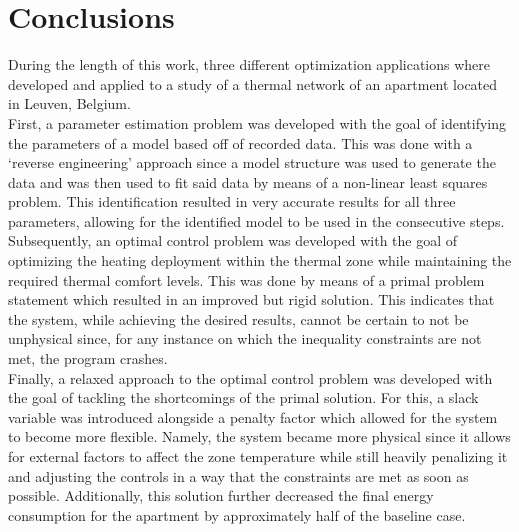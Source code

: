 \section{Conclusions}
\label{sec:conclusions}

During the length of this work, three different optimization applications where developed and applied to a study of a thermal network of an apartment located in Leuven, Belgium. \\

First, a parameter estimation problem was developed with the goal of identifying the parameters of a model based off of recorded data. This was done with a `reverse engineering' approach since a model structure was used to generate the data and was then used to fit said data by means of a non-linear least squares problem. This identification resulted in very accurate results for all three parameters, allowing for the identified model to be used in the consecutive steps.\\

Subsequently, an optimal control problem was developed with the goal of optimizing the heating deployment within the thermal zone while maintaining the required thermal comfort levels. This was done by means of a primal problem statement which resulted in an improved but rigid solution. This indicates that the system, while achieving the desired results, cannot be certain to not be unphysical since, for any instance on which the inequality constraints are not met, the program crashes.\\

Finally, a relaxed approach to the optimal control problem was developed with the goal of tackling the shortcomings of the primal solution. For this, a slack variable was introduced alongside a penalty factor which allowed for the system to become more flexible. Namely, the system became more physical since it allows for external factors to affect the zone temperature while still heavily penalizing it and adjusting the controls in a way that the constraints are met as soon as possible. Additionally, this solution further decreased the final energy consumption for the apartment by approximately half of the baseline case. 